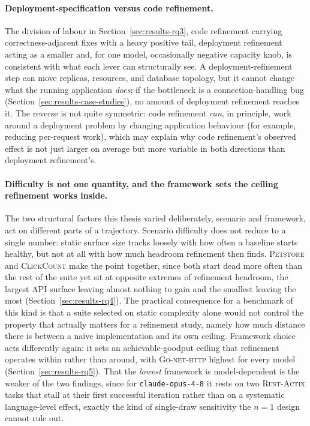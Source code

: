 \paragraph{Deployment-specification versus code refinement.} The division
of labour in Section~\ref{sec:results-rq3}, code refinement carrying
correctness-adjacent fixes with a heavy positive tail, deployment
refinement acting as a smaller and, for one model, occasionally negative
capacity knob, is consistent with what each lever can structurally see. A
deployment-refinement step can move replicas, resources, and database topology,
but it cannot change what the running application \emph{does}; if the
bottleneck is a connection-handling bug
(Section~\ref{sec:results-case-studies}), no amount of deployment refinement reaches
it. The reverse is not quite symmetric: code refinement \emph{can}, in
principle, work around a deployment problem by changing application
behaviour (for example, reducing per-request work), which may explain why
code refinement's observed effect is not just larger on average but more
variable in both directions than deployment refinement's.

\paragraph{Difficulty is not one quantity, and the framework sets the
ceiling refinement works inside.} The two structural factors this thesis
varied deliberately, scenario and framework, act on different parts of a
trajectory. Scenario difficulty does not reduce to a single number:
static surface size tracks loosely with how often a baseline starts
healthy, but not at all with how much headroom refinement then finds.
\textsc{Petstore} and \textsc{ClickCount} make the point together, since
both start dead more often than the rest of the suite yet sit at opposite
extremes of refinement headroom, the largest API surface leaving almost
nothing to gain and the smallest leaving the most
(Section~\ref{sec:results-rq4}). The practical
consequence for a benchmark of this kind is that a suite selected on
static complexity alone would not control the property that actually
matters for a refinement study, namely how much distance there is between
a naive implementation and its own ceiling. Framework choice acts
differently again: it sets an achievable-goodput ceiling that refinement
operates within rather than around, with \textsc{Go-net-http} highest for
every model (Section~\ref{sec:results-rq5}). That the \emph{lowest}
framework is model-dependent is the weaker of the two findings, since for
\texttt{claude-opus-4-8} it rests on two \textsc{Rust-Actix} tasks that
stall at their first successful iteration rather than on a systematic
language-level effect, exactly the kind of single-draw sensitivity the
$n=1$ design cannot rule out.

